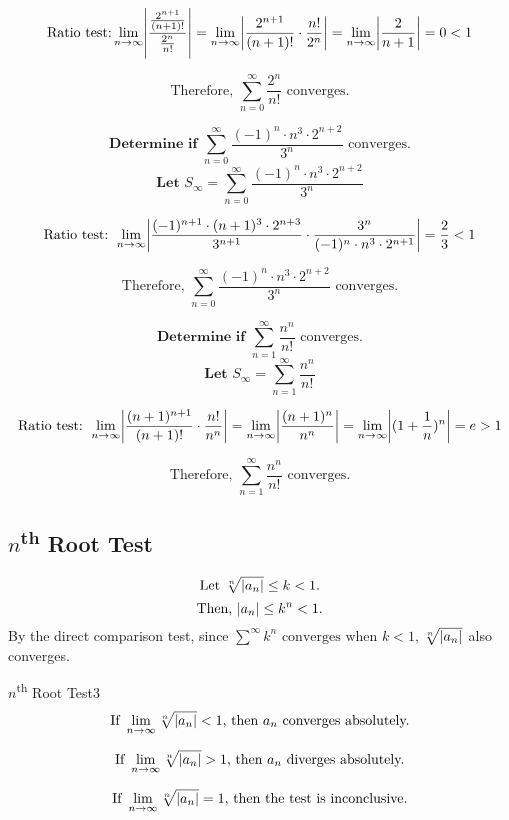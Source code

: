 \documentclass[10pt]{article}
\theoremstyle{definition}
\DeclarePairedDelimiter{\abs}{\lvert}{\rvert}
\begin{document}
\[\text{Ratio test:}
  \lim_{n \to \infty} \abs*{\frac{\frac{2^{n+1}}{(n+1)!}}{\frac{2^n}{n!}}}
= \lim_{n \to \infty} \abs*{\frac{2^{n+1}}{(n+1)!}  \cdot {\frac{n!}{2^n}}}
= \lim_{n \to \infty} \abs*{\frac{2}{n+1}} = 0 < 1 \]

\[\text{Therefore, }\sum_{n=0}^{\infty} \frac{2^n}{n!} \text{ converges.}\]

\vspace{0.5cm}

\[ \textbf{Determine if } \sum_{n=0}^{\infty} \frac{(-1)^n \cdot n^3 \cdot 2^{n+2}}{3^n} \text{ converges.} \]
\[ \textbf{Let } S_\infty=\sum_{n=0}^{\infty} \frac{(-1)^n \cdot n^3 \cdot 2^{n+2}}{3^n}\]


\[\text{Ratio test: } \lim_{n \to \infty} \abs*{\frac{(-1)^{n+1} \cdot (n+1)^3 \cdot 2^{n+3}}{3^{n+1}} \cdot \frac{3^n}{(-1)^n \cdot n^3 \cdot 2^{n+1}}} = \frac{2}{3} < 1\]

\[\text{Therefore, }\sum_{n=0}^{\infty} \frac{(-1)^n \cdot n^3 \cdot 2^{n+2}}{3^n} \text{ converges.}\]


\vspace{0.5cm}

\[ \textbf{Determine if } \sum_{n=1}^{\infty} \frac{n^n}{n!} \text{ converges.} \]
\[ \textbf{Let } S_\infty=\sum_{n=1}^{\infty} \frac{n^n}{n!}\]

\[\text{Ratio test: }\lim_{n \to \infty} \abs*{  \frac{(n+1)^{n+1}}{(n+1)!} \cdot \frac{n!}{n^n}}
= \lim_{n \to \infty} \abs*{ \frac{(n+1)^n}{n^n}} = \lim_{n \to \infty} \abs*{(1+\frac{1}{n})^n} = e > 1\]

\[\text{Therefore, }\sum_{n=1}^{\infty} \frac{n^n}{n!} \text{ converges.}\]




\subsection{$n$\textsuperscript{th} Root Test}

\[\text{Let } \sqrt[n]{\abs{a_n}} \le k < 1.\]
\[\text{Then, } \abs{a_n} \le k^n < 1.\]
By the direct comparison test,  since $\sum^{\infty}k^n \text{ converges when } k<1$, $\sqrt[n]{\abs{a_n}}$ also converges.

\begin{theorem}{$n$\textsuperscript{th} Root Test}{3}
\[\text{If } \lim_{n \to \infty} \sqrt[n]{\abs*{a_n}} < 1 \text{, then } a_n \text{ converges absolutely.} \]

\[\text{If } \lim_{n \to \infty} \sqrt[n]{\abs*{a_n}} > 1 \text{, then } a_n \text{ diverges absolutely.} \]

\[\text{If } \lim_{n \to \infty} \sqrt[n]{\abs*{a_n}} = 1 \text{, then the test is inconclusive.}\]
\end{theorem}
\end{document}
